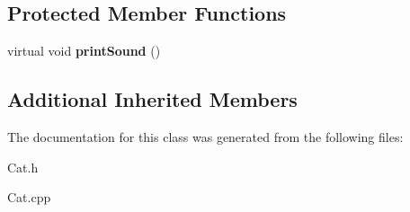 \subsection*{Protected Member Functions}
\begin{DoxyCompactItemize}
\item 
\mbox{\label{class_cat_a47b3ccbb7f4d63f70ce0c45c3352d19a}} 
virtual void {\bfseries print\+Sound} ()
\end{DoxyCompactItemize}
\subsection*{Additional Inherited Members}


The documentation for this class was generated from the following files\+:\begin{DoxyCompactItemize}
\item 
Cat.\+h\item 
Cat.\+cpp\end{DoxyCompactItemize}
